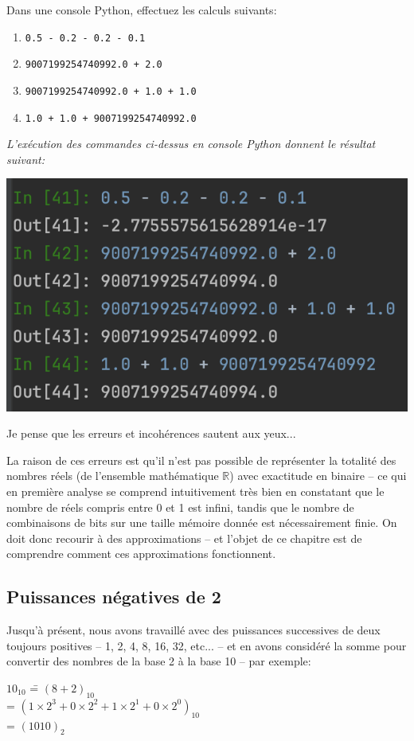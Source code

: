 \documentclass[12pt]{article}
\newenvironment{MaReponse}
		{\begin{greyedtextbox}\itshape} %
		{\end{greyedtextbox}}            %
\newenvironment{alphenum}
{\begin{enumerate}[label=\alph*.]}
	{\end{enumerate}}
\begin{document}
	\vspace{0.5\baselineskip}
	
	\begin{MonExo}
		Dans une console Python, effectuez les calculs suivants:
		\begin{alphenum}
			\item \texttt{0.5 - 0.2 - 0.2 - 0.1}
			\item \texttt{9007199254740992.0 + 2.0}
			\item \texttt{9007199254740992.0 + 1.0 + 1.0}
			\item \texttt{1.0 + 1.0 + 9007199254740992.0}
		\end{alphenum}
	\end{MonExo}
	\begin{MaReponse}
		L'exécution des commandes ci-dessus en console Python donnent le résultat suivant:
		\par
			\begin{minipage}{0.95\textwidth}
			\centering
			\includegraphics[width=0.5\linewidth]{012_FloatPython.png}
		\end{minipage}
		\par
		Je pense que les erreurs et incohérences sautent aux yeux...
	\end{MaReponse}
	
	La raison de ces erreurs est qu'il n'est pas possible de représenter la totalité des nombres réels (de l'ensemble mathématique $\mathbb{R}$) avec exactitude en binaire -- ce qui en première analyse se comprend intuitivement très bien en constatant que le nombre de réels compris entre 0 et 1 est infini, tandis que le nombre de combinaisons de bits sur une taille mémoire donnée est nécessairement finie. On doit donc recourir à des approximations -- et l'objet de ce chapitre est de comprendre comment ces approximations fonctionnent.
	
	\subsection{Puissances négatives de 2}
	Jusqu'à présent, nous avons travaillé avec des puissances successives de deux toujours positives -- 1, 2, 4, 8, 16, 32, etc... -- et en avons considéré la somme pour convertir des nombres de la base 2 à la base 10 -- par exemple:
	\begin{tabbing}
		$10_{10}$ \==  $(8 + 2)_{10}$ \\
		\>= $(1 \times 2^{3} + 0 \times 2^{2} + 1 \times 2^{1} + 0 \times 2^{0})_{10}$ \\
		\>= $(1010)_{2}$
	\end{tabbing}
	
\end{document}
